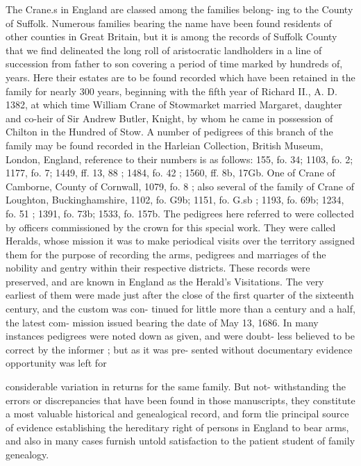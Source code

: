 \documentclass[oneside]{book}
\begin{document}
The Crane.s in England are classed among the families belong- 
ing to the County of Suffolk. Numerous families bearing the 
name have been found residents of other counties in Great 
Britain, but it is among the records of Suffolk County that we 
find delineated the long roll of aristocratic landholders in a line 
of succession from father to son covering a period of time marked 
by hundreds of, years. Here their estates are to be found recorded 
which have been retained in the family for nearly 300 years, 
beginning with the fifth year of Richard II., A. D. 1382, at 
which time William Crane of Stowmarket married Margaret, 
daughter and co-heir of Sir Andrew Butler, Knight, by whom he 
came in possession of Chilton in the Hundred of Stow. A number 
of pedigrees of this branch of the family may be found recorded 
in the Harleian Collection, British Museum, London, England, 
reference to their numbers is as follows: 155, fo. 34; 1103, fo. 
2; 1177, fo. 7; 1449, ff. 13, 88 ; 1484, fo. 42 ; 1560, ff. 8b, 17Gb. 
One of Crane of Camborne, County of Cornwall, 1079, fo. 8 ; also 
several of the family of Crane of Loughton, Buckinghamshire, 
1102, fo. G9b; 1151, fo. G.sb ; 1193, fo. 69b; 1234, fo. 51 ; 1391, 
fo. 73b; 1533, fo. 157b. The pedigrees here referred to were 
collected by officers commissioned by the crown for this special 
work. They were called Heralds, whose mission it was to make 
periodical visits over the territory assigned them for the purpose 
of recording the arms, pedigrees and marriages of the nobility 
and gentry within their respective districts. These records were 
preserved, and are known in England as the Herald's Visitations. 
The very earliest of them were made just after the close of the 
first quarter of the sixteenth century, and the custom was con- 
tinued for little more than a century and a half, the latest com- 
mission issued bearing the date of May 13, 1686. In many 
instances pedigrees were noted down as given, and were doubt- 
less believed to be correct by the informer ; but as it was pre- 
sented without documentary evidence opportunity was left for 




considerable variation in returns for the same family. But not- 
withstanding the errors or discrepancies that have been found in 
those manuscripts, they constitute a most valuable historical and 
genealogical record, and form tlie principal source of evidence 
establishing the hereditary right of persons in England to bear 
arms, and also in many cases furnish untold satisfaction to the 
patient student of family genealogy. 
\end{document}
